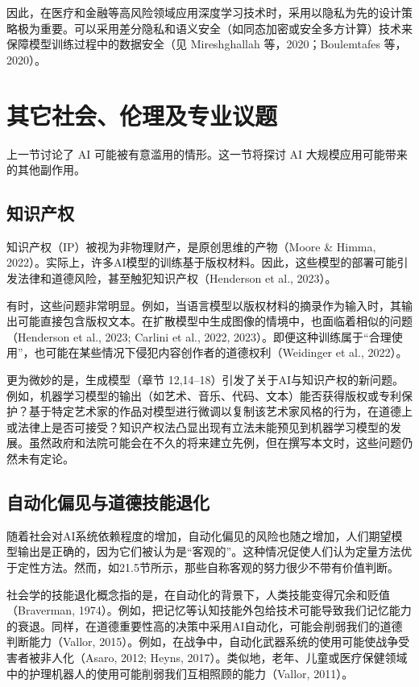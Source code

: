 因此，在医疗和金融等高风险领域应用深度学习技术时，采用以隐私为先的设计策略极为重要。可以采用差分隐私和语义安全（如同态加密或安全多方计算）技术来保障模型训练过程中的数据安全（见 Mireshghallah 等，2020；Boulemtafes 等，2020）。

\section{其它社会、伦理及专业议题}
上一节讨论了 AI 可能被有意滥用的情形。这一节将探讨 AI 大规模应用可能带来的其他副作用。

\subsection{知识产权}
知识产权（IP）被视为非物理财产，是原创思维的产物（Moore \& Himma, 2022）。实际上，许多AI模型的训练基于版权材料。因此，这些模型的部署可能引发法律和道德风险，甚至触犯知识产权（Henderson et al., 2023）。

有时，这些问题非常明显。例如，当语言模型以版权材料的摘录作为输入时，其输出可能直接包含版权文本。在扩散模型中生成图像的情境中，也面临着相似的问题（Henderson et al., 2023; Carlini et al., 2022, 2023）。即便这种训练属于“合理使用”，也可能在某些情况下侵犯内容创作者的道德权利（Weidinger et al., 2022）。

更为微妙的是，生成模型（章节 12,14–18）引发了关于AI与知识产权的新问题。例如，机器学习模型的输出（如艺术、音乐、代码、文本）能否获得版权或专利保护？基于特定艺术家的作品对模型进行微调以复制该艺术家风格的行为，在道德上或法律上是否可接受？知识产权法凸显出现有立法未能预见到机器学习模型的发展。虽然政府和法院可能会在不久的将来建立先例，但在撰写本文时，这些问题仍然未有定论。

\subsection{自动化偏见与道德技能退化}
随着社会对AI系统依赖程度的增加，自动化偏见的风险也随之增加，人们期望模型输出是正确的，因为它们被认为是“客观的”。这种情况促使人们认为定量方法优于定性方法。然而，如21.5节所示，那些自称客观的努力很少不带有价值判断。

社会学的技能退化概念指的是，在自动化的背景下，人类技能变得冗余和贬值（Braverman, 1974）。例如，把记忆等认知技能外包给技术可能导致我们记忆能力的衰退。同样，在道德重要性高的决策中采用AI自动化，可能会削弱我们的道德判断能力（Vallor, 2015）。例如，在战争中，自动化武器系统的使用可能使战争受害者被非人化（Asaro, 2012; Heyns, 2017）。类似地，老年、儿童或医疗保健领域中的护理机器人的使用可能削弱我们互相照顾的能力（Vallor, 2011）。

